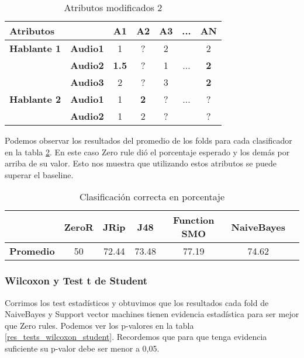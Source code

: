 \begin{table}[H]
	\centering
	\begin{tabular}{|l|l|ccccc|}
		\hline
		\multicolumn{2}{|l|}{Atributos} & A1 & A2 & A3 & ... & AN \\
		\hline 
		\textbf{Hablante 1} & \textbf{Audio1} & 1 & ? & 2 & & 2\\
		& \textbf{Audio2} & \textbf{1.5} & ? & 1 & ... & \textbf{2} \\
		& \textbf{Audio3} & 2 & ? & 3 & & \textbf{2} \\
		\hline
		\textbf{Hablante 2} & \textbf{Audio1} & 1 & \textbf{2} & ? & ... & ? \\
		& \textbf{Audio2} & 1 & 2 & ? & & ? \\
		\hline
	\end{tabular}
	\caption{Atributos modificados 2}
	\label{attr_mod}
\end{table}

Podemos observar los resultados del promedio de los folds para cada clasificador en la tabla \ref{class_corr_en_pct}. En este caso Zero rule dió el porcentaje esperado y los demás por arriba de su valor. Esto nos muestra que utilizando estos atributos se puede superar el baseline.

\begin{table}[H]
	\centering
	\begin{tabular}{|l|c|c|c|c|c|c|}
		\hline
		\textbf{}  & \textbf{ZeroR} & \textbf{JRip} & \textbf{J48} & \textbf{Function SMO} & \textbf{NaiveBayes} \\ \hline
		\textbf{Promedio} & 50 & 72.44 & 73.48 & 77.19 & 74.62 \\ \hline
	\end{tabular}
	\caption{Clasificación correcta en porcentaje}
	\label{class_corr_en_pct}
\end{table}

\subsubsection{Wilcoxon y Test t de Student}

Corrimos los test estadísticos y obtuvimos que los resultados cada fold de NaiveBayes y Support vector machines tienen evidencia estadística para ser mejor que Zero rules. Podemos ver los p-valores en la tabla \ref{res_tests_wilcoxon_student}. Recordemos que para que tenga evidencia suficiente su p-valor debe ser menor a 0,05.

